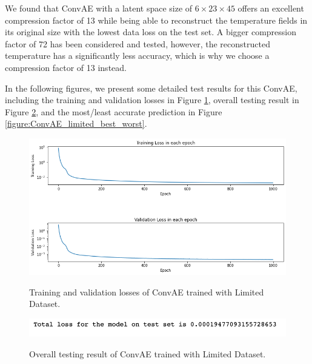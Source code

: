 We found that ConvAE with a latent space size of $6 \times 23 \times 45$ offers an excellent compression factor of 13 while being able to reconstruct the temperature fields in its original size with the lowest data loss on the test set. A bigger compression factor of 72 has been considered and tested, however, the reconstructed temperature has a significantly less accuracy, which is why we choose a compression factor of 13 instead.

In the following figures, we present some detailed test results for this ConvAE, including the training and validation losses in Figure \ref{figure:ConvAE_limited_losses}, overall testing result in Figure \ref{figure:ConvAE_limited_testing}, and the most/least accurate prediction in 
Figure \ref{figure:ConvAE_limited_best_worst}.

\begin{figure}[H]
    \caption{Training and validation losses of ConvAE trained with Limited Dataset.}
    \includegraphics[scale=0.6]{figures/mantle_convection_images/limited_dataset/ConvAE_trainingData.png}
    \label{figure:ConvAE_limited_losses}
\end{figure}

\begin{figure}[H]
    \caption{Overall testing result of ConvAE trained with Limited Dataset.}
    \includegraphics[scale=0.8]{figures/mantle_convection_images/limited_dataset/ConvAE_OverallTesting.png}
    \label{figure:ConvAE_limited_testing}
\end{figure}

